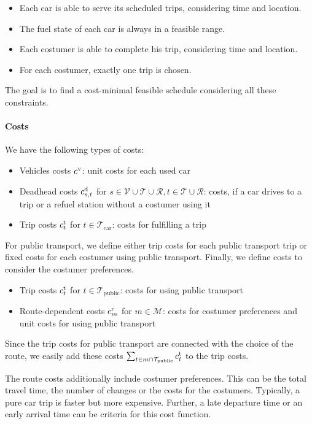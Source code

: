 \begin{itemize}
	\item{Each car is able to serve its scheduled trips, considering time and location.}
	\item{The fuel state of each car is always in a feasible range.}
	\item{Each costumer is able to complete his trip, considering time and location.}
	\item{For each costumer, exactly one trip is chosen.}
\end{itemize}

The goal is to find a cost-minimal feasible schedule considering all these constraints.

\paragraph{Costs} \parfill

We have the following types of costs:

\begin{itemize}
	\item{Vehicles costs $c^{\operatorname{v}}$: unit costs for each used car}
	\item{Deadhead costs $c^{\operatorname{d}}_{s,t}$ for $s\in\mathcal{V}\cup\mathcal{T}\cup\mathcal{R}, t\in\mathcal{T}\cup\mathcal{R}$: costs, if a car drives to a trip or a refuel station without a costumer using it}
	\item{Trip costs $c^{\operatorname{t}}_t$ for $t\in\mathcal{T}_{\operatorname{car}}$: costs for fulfilling a trip}
\end{itemize}

For public transport, we define either trip costs for each public transport trip or fixed costs for each costumer using public transport. Finally, we define costs to consider the costumer preferences.

\begin{itemize}
	\item{Trip costs $c^{\operatorname{t}}_t$ for $t\in\mathcal{T}_{\operatorname{public}}$: costs for using public transport}
	\item{Route-dependent costs $c^{\operatorname{r}}_m$ for $m\in\mathcal{M}$: costs for costumer preferences and unit costs for using public transport}
\end{itemize}

Since the trip costs for public transport are connected with the choice of the route, we easily add these costs $\sum_{t\in m\cap\mathcal{T}_{\operatorname{public}}}c^{\operatorname{t}}_t$ to the trip costs.

The route costs additionally include costumer preferences. This can be the total travel time, the number of changes or the costs for the costumers. Typically, a pure car trip is faster but more expensive. Further, a late departure time or an early arrival time can be criteria for this cost function.

